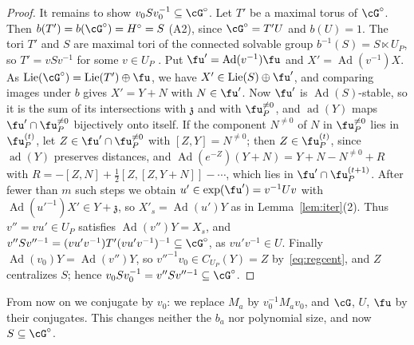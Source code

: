 \begin{proof}
It remains to show $v_0Sv_0^{-1}\subseteq\cG^\circ$. Let $T'$ be a maximal torus of $\cG^\circ$. Then
$b(T')=b(\cG^\circ)=H^\circ=S$ (A2), since $\cG^\circ=T'U$ and $b(U)=1$. The tori $T'$ and $S$ are maximal
tori of the connected solvable group $b^{-1}(S)=S\ltimes U_P$, so $T'=vSv^{-1}$ for some $v\in U_P$
\cite[10.6]{Bor91}. Put $\fu'=\operatorname{Ad}(v^{-1})\fu$ and $X'=\operatorname{Ad}(v^{-1})X$. As
$\operatorname{Lie}(\cG^\circ)=\operatorname{Lie}(T')\oplus\fu$, we have $X'\in\operatorname{Lie}(S)\oplus\fu'$, and comparing images under $b$
gives $X'=Y+N$ with $N\in\fu'$. Now $\fu'$ is $\operatorname{Ad}(S)$-stable, so it is the sum of its intersections
with $\mathfrak z$ and with $\fu_P^{\ne0}$, and $\operatorname{ad}(Y)$ maps $\fu'\cap\fu_P^{\ne0}$ bijectively onto itself.
If the component $N^{\ne0}$ of $N$ in $\fu_P^{\ne0}$ lies in $\fu_P^{(t)}$, let $Z\in\fu'\cap\fu_P^{\ne0}$
with $[Z,Y]=N^{\ne0}$; then $Z\in\fu_P^{(t)}$, since $\operatorname{ad}(Y)$ preserves distances, and
$\operatorname{Ad}(e^{-Z})(Y+N)=Y+N-N^{\ne0}+R$ with $R=-[Z,N]+\frac12[Z,[Z,Y+N]]-\cdots$, which lies in
$\fu'\cap\fu_P^{(t+1)}$. After fewer than $m$ such steps we obtain $u'\in\exp(\fu')=v^{-1}Uv$ with
$\operatorname{Ad}(u'^{-1})X'\in Y+\mathfrak z$, so $X'_s=\operatorname{Ad}(u')Y$ as in Lemma~\ref{lem:iter}(2). Thus
$v''=vu'\in U_P$ satisfies $\operatorname{Ad}(v'')Y=X_s$, and
$v''Sv''^{-1}=(vu'v^{-1})T'(vu'v^{-1})^{-1}\subseteq\cG^\circ$, as $vu'v^{-1}\in U$. Finally
$\operatorname{Ad}(v_0)Y=\operatorname{Ad}(v'')Y$, so $v''^{-1}v_0\in C_{U_P}(Y)=Z$ by~\eqref{eq:regcent}, and $Z$ centralizes $S$;
hence $v_0Sv_0^{-1}=v''Sv''^{-1}\subseteq\cG^\circ$.
\end{proof}

From now on we conjugate by $v_0$: we replace $M_a$ by $v_0^{-1}M_av_0$, and $\cG$, $U$, $\fu$ by their
conjugates. This changes neither the $b_a$ nor polynomial size, and now $S\subseteq\cG^\circ$.

